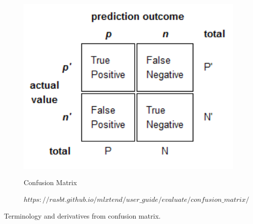 \begin{figure}[tbh] %
\begin{large}
	\includegraphics[width=6in]{images/confusionmatrix.png}
	\caption{Confusion Matrix} %
	
	\caption*{$https://rasbt.github.io/mlxtend/user\_guide/evaluate/confusion\_matrix/$}
	\label{Confusion matrix} %
\end{large}
\end{figure} 
\par
Terminology and derivatives from confusion matrix.

